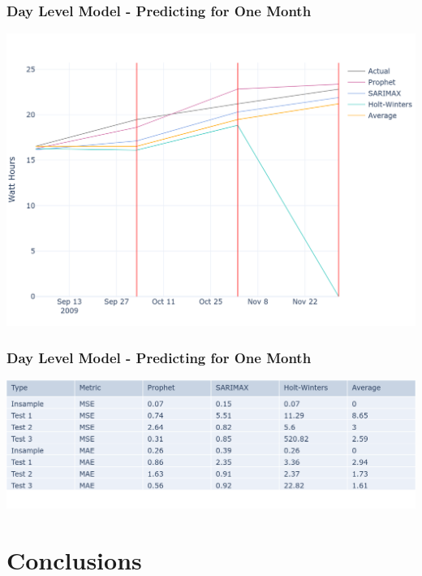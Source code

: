 \documentclass[10pt]{beamer}
\begin{document}
\begin{frame}
\frametitle{Day Level Model - Predicting for One Month}

\bigskip
{
    \centering
    \includegraphics[width=\textwidth,height=\textheight,keepaspectratio]{model_comparison_timeseries_daymodel_months.png}
    \par
}
\bigskip

\end{frame}

\begin{frame}
\frametitle{Day Level Model - Predicting for One Month}

\bigskip
{
    \centering
    \includegraphics[width=\textwidth,height=\textheight,keepaspectratio]{model_comparison_table_daymodel_months.png}
    \par
}
\bigskip


\end{frame}

\section{Conclusions}
\end{document}
